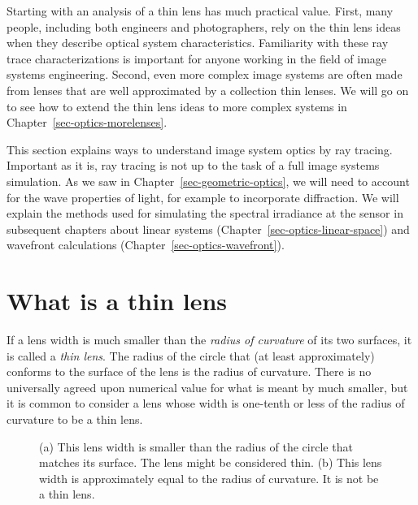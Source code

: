 \documentclass[
  letterpaper,
]{book}
\begin{document}
Starting with an analysis of a thin lens has much practical value.
First, many people, including both engineers and photographers, rely on
the thin lens ideas when they describe optical system characteristics.
Familiarity with these ray trace characterizations is important for
anyone working in the field of image systems engineering. Second, even
more complex image systems are often made from lenses that are well
approximated by a collection thin lenses. We will go on to see how to
extend the thin lens ideas to more complex systems in
Chapter~\ref{sec-optics-morelenses}.

This section explains ways to understand image system optics by ray
tracing. Important as it is, ray tracing is not up to the task of a full
image systems simulation. As we saw in
Chapter~\ref{sec-geometric-optics}, we will need to account for the wave
properties of light, for example to incorporate diffraction. We will
explain the methods used for simulating the spectral irradiance at the
sensor in subsequent chapters about linear systems
(Chapter~\ref{sec-optics-linear-space}) and wavefront calculations
(Chapter~\ref{sec-optics-wavefront}).

\section{What is a thin lens}\label{sec-optics-thinlensdefined}

If a lens width is much smaller than the \emph{radius of curvature} of
its two surfaces, it is called a \emph{thin lens}. The radius of the
circle that (at least approximately) conforms to the surface of the lens
is the radius of curvature. There is no universally agreed upon
numerical value for what is meant by much smaller, but it is common to
consider a lens whose width is one-tenth or less of the radius of
curvature to be a thin lens.

\begin{figure}


\caption{\label{fig-thinlens-definition}(a) This lens width is smaller
than the radius of the circle that matches its surface. The lens might
be considered thin. (b) This lens width is approximately equal to the
radius of curvature. It is not be a thin lens.}

\end{figure}%
\end{document}
